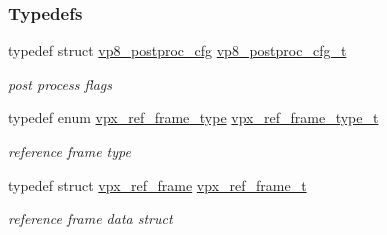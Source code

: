 \subsubsection*{\-Typedefs}
\begin{DoxyCompactItemize}
\item 
typedef struct \hyperlink{structvp8__postproc__cfg}{vp8\-\_\-postproc\-\_\-cfg} \hyperlink{group__vp8_ga7e9e955211711b2f915bc59640cc0ef0}{vp8\-\_\-postproc\-\_\-cfg\-\_\-t}
\begin{DoxyCompactList}\small\item\em post process flags \end{DoxyCompactList}\item 
typedef enum \hyperlink{group__vp8_gad8ab72d8a178a68339dad2987358c331}{vpx\-\_\-ref\-\_\-frame\-\_\-type} \hyperlink{group__vp8_ga75ac0689a81bf7202382a225c5b451b4}{vpx\-\_\-ref\-\_\-frame\-\_\-type\-\_\-t}
\begin{DoxyCompactList}\small\item\em reference frame type \end{DoxyCompactList}\item 
typedef struct \hyperlink{structvpx__ref__frame}{vpx\-\_\-ref\-\_\-frame} \hyperlink{group__vp8_ga9157c53799cdafd12ebee65d04e16825}{vpx\-\_\-ref\-\_\-frame\-\_\-t}
\begin{DoxyCompactList}\small\item\em reference frame data struct \end{DoxyCompactList}\end{DoxyCompactItemize}
